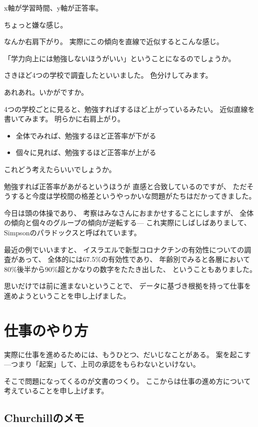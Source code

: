 \documentclass[uplatex,jis2004,dvipdfmx,12pt]{jsarticle}
\begin{document}
x軸が学習時間、y軸が正答率。

ちょっと嫌な感じ。

なんか右肩下がり。
実際にこの傾向を直線で近似するとこんな感じ。

「学力向上には勉強しないほうがいい」ということになるのでしょうか。

さきほど4つの学校で調査したといいました。
色分けしてみます。

あれあれ。いかがですか。

4つの学校ごとに見ると、勉強すればするほど上がっているみたい。
近似直線を書いてみます。
明らかに右肩上がり。


\begin{itemize}
 \item 全体でみれば、勉強するほど正答率が下がる
 \item 個々に見れば、勉強するほど正答率が上がる
\end{itemize}
これどう考えたらいいでしょうか。

勉強すれば正答率があがるというほうが
直感と合致しているのですが、
ただそうすると今度は学校間の格差というやっかいな問題がたちはだかってきました。

今日は頭の体操であり、
考察はみなさんにおまかせすることにしますが、
全体の傾向と個々のグループの傾向が逆転する---
これ実際にしばしばありまして、
Simpsonのパラドックスと呼ばれています。

最近の例でいいますと、
イスラエルで新型コロナクチンの有効性についての調査があって、
全体的には67.5\%の有効性であり、
年齢別でみると各層において80\%後半から90\%超とかなりの数字をたたき出した、
ということもありました。




思いだけでは前に進まないということで、
データに基づき根拠を持って仕事を進めようということを申し上げました。
\newpage

\section{仕事のやり方}


実際に仕事を進めるためには、もうひとつ、だいじなことがある。
案を起こす---つまり「起案」して、上司の承認をもらわないといけない。

そこで問題になってくるのが文書のつくり。
ここからは仕事の進め方について考えていることを申し上げます。

\subsection{Churchillのメモ}
\end{document}
